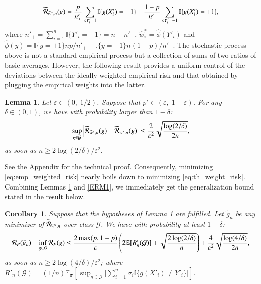 \documentclass[12pt]{article}
\newtheorem{corollary}{{\bf Corollary}}
\newtheorem{lemma}{{\bf Lemma}}
\newcommand{\cR}{{\cal R}}
\begin{document}
\begin{equation}\label{eq:emp_weighted_risk}
    \widetilde{\cR}_{\widehat{w}^*,n}(g)
    =\frac{p}{n'_+}\sum_{i: Y'_i=1}\mathbb{I}\{g(X'_i)=-1  \}
    + \frac{1-p}{n'_-}\sum_{i: Y'_i=-1}\mathbb{I}\{g(X'_i)=+1  \},
\end{equation}
where $n'_+=\sum_{i=1}^n\mathbb{I}\{Y'_i=+1  \}=n-n'_-$,
$\widehat{w}_i^*=\widehat{\phi}(Y'_i)$ and
$\widehat{\phi}(y)=\mathbb{I}\{ y=+1 \}np/n' _++ \mathbb{I}\{ y=-1 \}n(1-p)/n'_-
$. The stochastic process above is not a standard empirical process but a collection of sums of two ratios of basic averages. However, the following result provides a uniform control of the deviations between the ideally weighted empirical risk and that obtained by plugging the empirical weights into the latter.
\begin{lemma}\label{lem:approx1}
Let $\varepsilon\in(0,\; 1/2)$. Suppose that $p'\in (\varepsilon,\; 1-\varepsilon)$. For any $\delta\in (0,1)$, we have with probability larger than $1-\delta$:
$$
\sup_{g\in \mathcal{G}}\left\vert  \widetilde{\cR}_{\widehat{w}^*,n}(g)-    \widetilde{\cR}_{w^*,n}(g) \right\vert
\leq \frac{2}{\varepsilon^2} \sqrt{\frac{\log (2/\delta)}{2n}},
$$
as soon as $n\geq 2\log(2/\delta)/\varepsilon^2$.
\end{lemma}
See the Appendix for the technical proof. Consequently, minimizing \eqref{eq:emp_weighted_risk} nearly boils down to minimizing \eqref{eq:th_weight_risk}. Combining Lemmas \ref{lem:approx1} and \ref{ERM1}, we immediately get the generalization bound stated in the result below.
\begin{corollary}\label{cor1}
Suppose that the hypotheses of Lemma \ref{lem:approx1} are fulfilled. Let $\widetilde{g}_n$ be any minimizer of
$\widetilde{\cR}_{\widehat{w}^*,n}$ over class $\mathcal{G}$. We
have with probability at least $1- \delta$:
\begin{equation*}
    \cR_P (\widetilde{g}_n) - \inf_{g\in \mathcal{G}}\cR_P(g)
    \leq \frac{2\max(p, 1-p) }{\varepsilon}
    \left( 2 \mathbb{E}[R'_n(\mathcal{G})  ]     +\sqrt{\frac{2\log(2/\delta)}{n}} \right)
+ \frac{4}{\varepsilon^2} \sqrt{\frac{\log (4/\delta)}{2n}},
\end{equation*}
as soon as $n\geq 2\log(4/\delta)/\varepsilon^2$; where $R'_n(\mathcal{G})=(1/n)\mathbb{E}_{\mathbf{\sigma}}[\sup_{g\in \mathcal{G}}\vert \sum_{i=1}^n\sigma_i \mathbb{I}\{g(X'_i)\neq Y'_i\} \vert]$.
\end{corollary}
\end{document}
